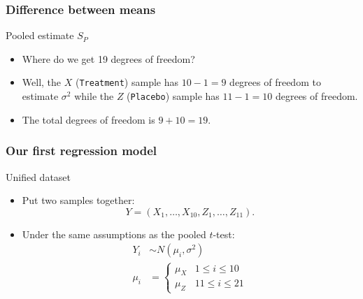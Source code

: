 \documentclass[handout]{beamer}
\begin{document}
   \begin{frame} \frametitle{Difference between means}

   \begin{block}
   {Pooled estimate $S_P$}
   \begin{itemize}
   \item Where do we get 19 degrees of freedom?
   \item Well, the $X$ ({\tt Treatment}) sample has $10-1=9$ degrees of freedom
   to estimate $\sigma^2$ while the $Z$ ({\tt Placebo}) sample
   has $11-1=10$ degrees of freedom.
   \item The total degrees of freedom is $9+10=19$.
   \end{itemize}
   \end{block}
   \end{frame}


   \begin{frame} \frametitle{Our first regression model}

   \begin{block}
   {Unified dataset}
   \begin{itemize}

   \item Put two samples together:
   $$Y=(X_1,\dots, X_{10}, Z_1, \dots, Z_{11}).$$

   \item Under the same assumptions as the pooled $t$-test:
   $$
   \begin{aligned}
   Y_i &\sim N(\mu_i, \sigma^2)\\
   \mu_i &=
   \begin{cases}
   \mu_X & 1 \leq i \leq 10 \\ \mu_Z & 11 \leq i \leq 21
   \end{cases}
   \end{aligned}
   $$
   \end{itemize}
   \end{block}
   \end{frame}

\end{document}
